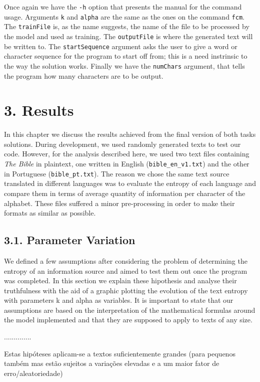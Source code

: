 \documentclass[12pt]{article}
\begin{document}
Once again we have the \texttt{-h} option that presents the manual for the 
command usage.
Arguments \texttt{k} and \texttt{alpha} are the same as the ones on the 
command \texttt{fcm}.
The \texttt{trainFile} is, as the name suggests, the name of the file to be
processed by the model and used as training.
The \texttt{outputFile} is where the generated text will be written to.
The \texttt{startSequence} argument asks the user to give a word or character
sequence for the program to start off from; this is a need instrinsic to the
way the solution works.
Finally we have the \texttt{numChars} argument, that tells the program how 
many characters are to be output.

\section*{3. Results}

In this chapter we discuss the results achieved from the final version of 
both tasks solutions. 
During development, we used randomly generated texts to test our code.
However, for the analysis described here, we used two text files
containing {\it The Bible\/} in plaintext, one written in English 
(\texttt{bible\_en\_v1.txt}) and the other in Portuguese 
(\texttt{bible\_pt.txt}).
The reason we chose the same text source translated in different languages
was to evaluate the entropy of each language and compare them in terms of 
average quantity of information per character of the alphabet.
These files suffered a minor pre-processing in order to make their formats 
as similar as possible.

\subsection*{3.1. Parameter Variation}

We defined a few assumptions after considering the problem of determining
the entropy of an information source and aimed to test them out once the 
program was completed.
In this section we explain these hipothesis and analyse their truthfulness
with the aid of a graphic plotting the evolution of the text entropy with
parameters k and alpha as variables.
It is important to state that our assumptions are based on the interpretation
of the mathematical formulas around the model implemented and that they 
are supposed to apply to texts of any size.

..............


Estas hipóteses aplicam-se a textos suficientemente grandes
(para pequenos também mas estão sujeitos a variações elevadas e a um maior fator de erro/aleatoriedade)
\end{document}
